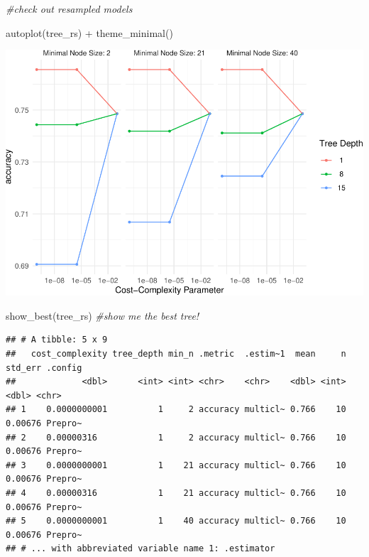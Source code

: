 \documentclass[
]{article}
\newenvironment{Shaded}{\begin{snugshade}}{\end{snugshade}}
\newcommand{\CommentTok}[1]{\textcolor[rgb]{0.56,0.35,0.01}{\textit{#1}}}
\newcommand{\FunctionTok}[1]{\textcolor[rgb]{0.00,0.00,0.00}{#1}}
\newcommand{\NormalTok}[1]{#1}
\newcommand{\SpecialCharTok}[1]{\textcolor[rgb]{0.00,0.00,0.00}{#1}}
\begin{document}
\begin{Shaded}
\begin{Highlighting}[]
\CommentTok{\#check out resampled models}

\FunctionTok{autoplot}\NormalTok{(tree\_rs) }\SpecialCharTok{+}
  \FunctionTok{theme\_minimal}\NormalTok{()}
\end{Highlighting}
\end{Shaded}

\includegraphics{lab5_files/figure-latex/unnamed-chunk-5-1.pdf}

\begin{Shaded}
\begin{Highlighting}[]
\FunctionTok{show\_best}\NormalTok{(tree\_rs) }\CommentTok{\#show me the best tree! }
\end{Highlighting}
\end{Shaded}

\begin{verbatim}
## # A tibble: 5 x 9
##   cost_complexity tree_depth min_n .metric  .estim~1  mean     n std_err .config
##             <dbl>      <int> <int> <chr>    <chr>    <dbl> <int>   <dbl> <chr>  
## 1    0.0000000001          1     2 accuracy multicl~ 0.766    10 0.00676 Prepro~
## 2    0.00000316            1     2 accuracy multicl~ 0.766    10 0.00676 Prepro~
## 3    0.0000000001          1    21 accuracy multicl~ 0.766    10 0.00676 Prepro~
## 4    0.00000316            1    21 accuracy multicl~ 0.766    10 0.00676 Prepro~
## 5    0.0000000001          1    40 accuracy multicl~ 0.766    10 0.00676 Prepro~
## # ... with abbreviated variable name 1: .estimator
\end{verbatim}
\end{document}
